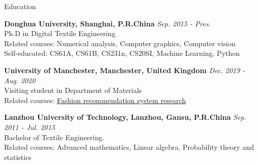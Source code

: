 \documentclass{resume} %
\begin{document}

\begin{rSection}{Education}

{\bf Donghua University, Shanghai, P.R.China} \hfill {\em Sep. 2015 - Pres.} 
\\ Ph.D in Digital Textile Engineering
\\ Related courses: Numerical analysis, Computer graphics, Computer vision
\\ Self-educated: CS61A, CS61B, CS231n, CS20SI, Machine Learning, Python

{\bf University of Manchester, Manchester, United Kingdom} \hfill {\em Dec. 2019 - Aug. 2020} 
\\ Visiting student in Department of Materials
\\ Related courses: \href{https://www.research.manchester.ac.uk/portal/hugh.gong.html}{Fashion recommendation system research}

{\bf Lanzhou University of Technology, Lanzhou, Gansu, P.R.China} \hfill {\em Sep. 2011 - Jul. 2015} 
\\ Bachelor of Textile Engineering.
\\ Related courses: Advanced mathematics, Linear algebra, Probability theory and statistics


\end{rSection}
\end{document}
